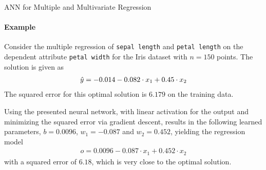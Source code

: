 \begin{frame}{ANN for Multiple and Multivariate Regression}
\framesubtitle{Example}
Consider the multiple regression of {\tt sepal length} and {\tt petal
length} on the dependent attribute {\tt petal width} for the Iris
dataset with $n=150$ points. 
The solution is given as
   \begin{align*}
       \hat{y} = -0.014 -0.082 \cdot x_{1} + 0.45\cdot x_{2}
\end{align*}
    The squared error for this optimal solution is $6.179$ on the
    training data.

Using the presented neural network,%
with linear activation
for the output and minimizing the squared error via gradient descent,
results in the following learned parameters, $b = 0.0096$, $w_1 =
-0.087$ and $w_2 = 0.452$, yielding the regression model
\begin{align*}
    o = 0.0096 - 0.087 \cdot x_{1} + 0.452 \cdot x_{2}
\end{align*}
with a squared error of $6.18$, which is very close to the optimal
solution. 
\end{frame}

